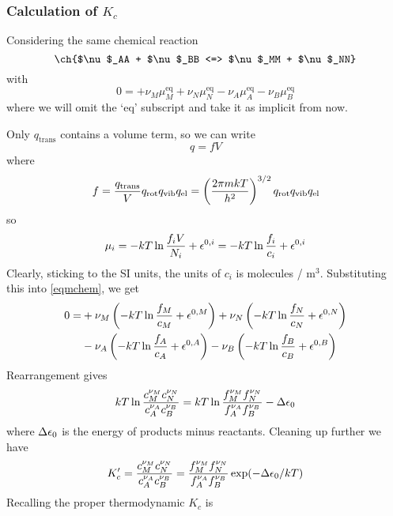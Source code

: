 \subsubsection{Calculation of \texorpdfstring{$K_c$}{Kc}}
Considering the same chemical reaction 
\begin{equation}
  \ch{$\nu$_AA + $\nu$_BB <=> $\nu$_MM + $\nu$_NN}
\end{equation}
with
\begin{equation}
\label{eqmchem}
  0=+\nu_M\mu^{\text{eq}}_M+\nu_N\mu^{\text{eq}}_N-\nu_A\mu^{\text{eq}}_A-\nu_B\mu^{\text{eq}}_B
\end{equation}
where we will omit the `eq' subscript and take it as implicit from now. \par
Only $q_{\text{trans}}$ contains a volume term, so we can write
\begin{equation}
  q=fV
\end{equation}
where
\begin{equation}
  f=\frac{q_{\text{trans}}}{V}q_{\text{rot}}q_{\text{vib}}q_{\text{el}}=\left(\frac{2\pi mkT}{h^2} \right)^{3/2}q_{\text{rot}}q_{\text{vib}}q_{\text{el}}
\end{equation}
so
\begin{equation}
  \mu_i=-kT\ln\frac{f_iV}{N_i}+\epsilon^{0,i}=-kT\ln\frac{f_i}{c_i}+\epsilon^{0,i}
\end{equation}
Clearly, sticking to the SI units, the units of $c_i$ is molecules / m$^3$. Substituting this into \cref{eqmchem}, we get
\begin{equation}
\begin{aligned}
  0=&+\nu_M\left(-kT\ln\frac{f_M}{c_M}+\epsilon^{0,M} \right)+\nu_N\left(-kT\ln\frac{f_N}{c_N}+\epsilon^{0,N} \right)\\
  &-\nu_A\left(-kT\ln\frac{f_A}{c_A}+\epsilon^{0,A} \right)-\nu_B\left(-kT\ln\frac{f_B}{c_B}+\epsilon^{0,B} \right)
\end{aligned}
\end{equation}
Rearrangement gives
\begin{equation}
  kT\ln\frac{c_M^{\nu_M}c_N^{\nu_N}}{c_A^{\nu_A}c_B^{\nu_B}}=kT\ln\frac{f_M^{\nu_M}f_N^{\nu_N}}{f_A^{\nu_A}f_B^{\nu_B}}-\Delta\epsilon_0
\end{equation}
where $\Delta\epsilon_0$ is the energy of products minus reactants. Cleaning up further we have
\begin{equation}
  K_c'=\frac{c_M^{\nu_M}c_N^{\nu_N}}{c_A^{\nu_A}c_B^{\nu_B}}=\frac{f_M^{\nu_M}f_N^{\nu_N}}{f_A^{\nu_A}f_B^{\nu_B}}\exp(-\Delta\epsilon_0/kT)
\end{equation}
Recalling the proper thermodynamic $K_c$ is
